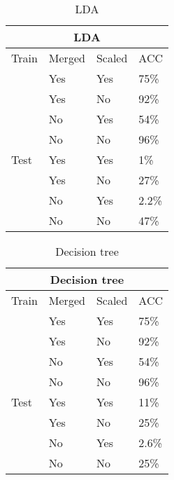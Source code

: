 \documentclass[17pt]{article}
\begin{document}
\begin{table}[]
	\caption{LDA}
	\label{LDAtable}
	\centering
	\begin{tabular}{|l|l|l|l|}
		\hline
		\multicolumn{4}{|c|}{LDA}\\
		\cline{1-4}
		\hline
		Train & Merged & Scaled & ACC \\
		\cline{2-4}
		&    Yes      &   Yes    & 75\%  \\
		\cline{2-4}
		&    Yes      &   No     & 92\% \\
		\cline{2-4}
		& No & Yes & 54\% \\
		\cline{2-4}
		& No & No & 96\%\\
		\hline
		
		Test & Yes & Yes & 1\% \\
		\cline{2-4}
		&    Yes      &   No     & 27\%\\
		\cline{2-4}
		& No & Yes & 2.2\% \\
		\cline{2-4}
		& No & No & 47\%\\
		\hline
	\end{tabular}
\end{table}

\begin{table}[]
	\caption{Decision tree}
	\centering
	\label{treeTable}
	\begin{tabular}{|l|l|l|l|}
		\hline
		\multicolumn{4}{|c|}{Decision tree}\\
		\cline{1-4}
		\hline
		Train & Merged & Scaled & ACC \\
		\cline{2-4}
		&    Yes      &   Yes    & 75\%  \\
		\cline{2-4}
		&    Yes      &   No     & 92\%\\
		\cline{2-4}
		& No & Yes & 54\% \\
		\cline{2-4}
		& No & No & 96\%\\
		\hline
		
		Test & Yes & Yes & 11\% \\
		\cline{2-4}
		&    Yes      &   No     & 25\%\\
		\cline{2-4}
		& No & Yes & 2.6\% \\
		\cline{2-4}
		& No & No & 25\%\\
		\hline
	\end{tabular}
\end{table}
\end{document}
